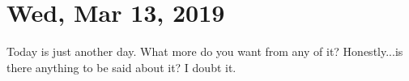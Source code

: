 \section{Wed, Mar 13, 2019}

Today is just another day. What more do you want from any of it? Honestly...is 
there anything to be said about it? I doubt it.
